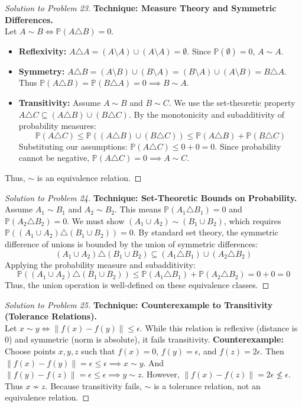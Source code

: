 \documentclass[11pt, a4paper]{article}
\theoremstyle{definition}
\theoremstyle{remark}
\newcommand{\Prob}{\mathbb{P}}
\begin{document}
\begin{proof}[Solution to Problem 23]
    \textbf{Technique: Measure Theory and Symmetric Differences.} \\
    Let $A \sim B \iff \Prob(A \triangle B) = 0$.
    \begin{itemize}
        \item \textbf{Reflexivity:} $A \triangle A = (A \setminus A) \cup (A \setminus A) = \emptyset$. Since $\Prob(\emptyset) = 0$, $A \sim A$.
        \item \textbf{Symmetry:} $A \triangle B = (A \setminus B) \cup (B \setminus A) = (B \setminus A) \cup (A \setminus B) = B \triangle A$. Thus $\Prob(A \triangle B) = \Prob(B \triangle A) = 0 \implies B \sim A$.
        \item \textbf{Transitivity:} Assume $A \sim B$ and $B \sim C$. We use the set-theoretic property $A \triangle C \subseteq (A \triangle B) \cup (B \triangle C)$. By the monotonicity and subadditivity of probability measures:
        \[ \Prob(A \triangle C) \le \Prob((A \triangle B) \cup (B \triangle C)) \le \Prob(A \triangle B) + \Prob(B \triangle C) \]
        Substituting our assumptions: $\Prob(A \triangle C) \le 0 + 0 = 0$. Since probability cannot be negative, $\Prob(A \triangle C) = 0 \implies A \sim C$.
    \end{itemize}
    Thus, $\sim$ is an equivalence relation.
\end{proof}

\begin{proof}[Solution to Problem 24]
    \textbf{Technique: Set-Theoretic Bounds on Probability.} \\
    Assume $A_1 \sim B_1$ and $A_2 \sim B_2$. This means $\Prob(A_1 \triangle B_1) = 0$ and $\Prob(A_2 \triangle B_2) = 0$. We must show $(A_1 \cup A_2) \sim (B_1 \cup B_2)$, which requires $\Prob((A_1 \cup A_2) \triangle (B_1 \cup B_2)) = 0$.
    By standard set theory, the symmetric difference of unions is bounded by the union of symmetric differences:
    \[ (A_1 \cup A_2) \triangle (B_1 \cup B_2) \subseteq (A_1 \triangle B_1) \cup (A_2 \triangle B_2) \]
    Applying the probability measure and subadditivity:
    \[ \Prob((A_1 \cup A_2) \triangle (B_1 \cup B_2)) \le \Prob(A_1 \triangle B_1) + \Prob(A_2 \triangle B_2) = 0 + 0 = 0 \]
    Thus, the union operation is well-defined on these equivalence classes.
\end{proof}

\begin{proof}[Solution to Problem 25]
    \textbf{Technique: Counterexample to Transitivity (Tolerance Relations).} \\
    Let $x \sim y \iff \|f(x) - f(y)\| \le \epsilon$. While this relation is reflexive (distance is 0) and symmetric (norm is absolute), it fails transitivity.
    \textbf{Counterexample:} Choose points $x, y, z$ such that $f(x) = 0$, $f(y) = \epsilon$, and $f(z) = 2\epsilon$.
    Then $\|f(x) - f(y)\| = \epsilon \le \epsilon \implies x \sim y$.
    And $\|f(y) - f(z)\| = \epsilon \le \epsilon \implies y \sim z$.
    However, $\|f(x) - f(z)\| = 2\epsilon \not\le \epsilon$. Thus $x \not\sim z$.
    Because transitivity fails, $\sim$ is a tolerance relation, not an equivalence relation.
\end{proof}
\end{document}
